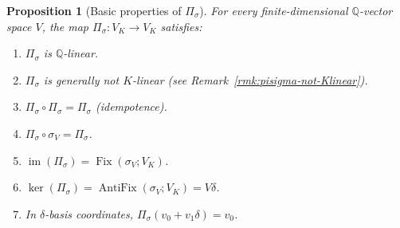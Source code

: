 \documentclass[11pt, a4paper]{amsart}
\newtheorem{proposition}[theorem]{Proposition}
\theoremstyle{definition}
\newcommand{\Q}{\mathbb{Q}}
\newcommand{\Fix}{\operatorname{Fix}}
\newcommand{\im}{\operatorname{im}}
\begin{document}
\begin{proposition}[Basic properties of $\Pi_\sigma$]
\label{prop:pisigma-basic}
For every finite-dimensional $\Q$-vector space $V$, the map
$\Pi_\sigma \colon V_K \to V_K$ satisfies:
\begin{enumerate}
\item $\Pi_\sigma$ is $\Q$-linear.
\item $\Pi_\sigma$ is generally not $K$-linear (see
  Remark~\ref{rmk:pisigma-not-Klinear}).
\item $\Pi_\sigma \circ \Pi_\sigma = \Pi_\sigma$ (idempotence).
\item $\Pi_\sigma \circ \sigma_V = \Pi_\sigma$.
\item $\im(\Pi_\sigma) = \Fix(\sigma_V; V_K)$.
\item $\ker(\Pi_\sigma) = \operatorname{AntiFix}(\sigma_V; V_K) = V\delta$.
\item In $\delta$-basis coordinates, $\Pi_\sigma(v_0 + v_1\delta)
  = v_0$.
\end{enumerate}
\end{proposition}
\end{document}
